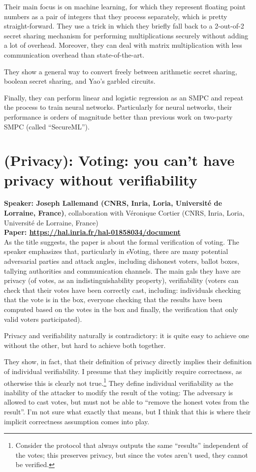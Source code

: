 \documentclass{article}
\begin{document}
Their main focus is on machine learning, for which they represent floating point numbers as a pair of integers that they process separately, which is pretty straight-forward.
They use a trick in which they briefly fall back to a 2-out-of-2 secret sharing mechanism for performing multiplications securely without adding a lot of overhead. Moreover, they can deal with matrix multiplication with less communication overhead than state-of-the-art.

They show a general way to convert freely between arithmetic secret sharing, boolean secret sharing, and Yao's garbled circuits.

Finally, they can perform linear and logistic regression as an SMPC and repeat the process to train neural networks. Particularly for neural networks, their performance is orders of magnitude better than previous work on two-party SMPC (called ``SecureML'').

\section{(Privacy): Voting: you can’t have privacy without verifiability}
\noindent\textbf{Speaker: Joseph Lallemand (CNRS, Inria, Loria, Université de Lorraine, France)}, collaboration with Véronique Cortier (CNRS, Inria, Loria, Université de Lorraine, France)\\
\noindent\textbf{Paper: \url{https://hal.inria.fr/hal-01858034/document}}\\

As the title suggests, the paper is about the formal verification of voting.
The speaker emphasizes that, particularly in eVoting, there are many potential adversarial parties and attack angles, including dishonest voters, ballot boxes, tallying authorities and communication channels. The main gals they have are privacy (of votes, as an indistinguishability property), verifiability (voters can check that their votes have been correctly cast, including: individuals checking that the vote is in the box, everyone checking that the results have been computed based on the votes in the box and finally, the verification that only valid voters participated).

Privacy and verifiability naturally is contradictory: it is quite easy to achieve one without the other, but hard to achieve both together.

They show, in fact, that their definition of privacy directly implies their definition of individual verifiability. I presume that they implicitly require correctness, as otherwise this is clearly not true.\footnote{Consider the protocol that always outputs the same ``results'' independent of the votes; this preserves privacy, but since the votes aren't used, they cannot be verified.}
They define individual verifiability as the inability of the attacker to modify the result of the voting: The adversary is allowed to cast votes, but must not be able to ``remove the honest votes from the result''. I'm not sure what exactly that means, but I think that this is where their implicit correctness assumption comes into play. 
\end{document}
